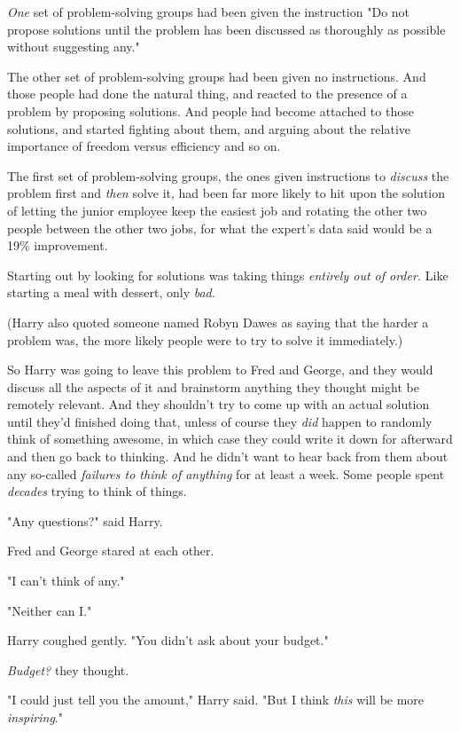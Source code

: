 \emph{One} set of problem-solving groups had been given the instruction "Do not
propose solutions until the problem has been discussed as thoroughly as
possible without suggesting any."

The other set of problem-solving groups had been given no instructions. And
those people had done the natural thing, and reacted to the presence of a
problem by proposing solutions. And people had become attached to those
solutions, and started fighting about them, and arguing about the relative
importance of freedom versus efficiency and so on.

The first set of problem-solving groups, the ones given instructions to
\emph{discuss} the problem first and \emph{then} solve it, had been far more
likely to hit upon the solution of letting the junior employee keep the easiest
job and rotating the other two people between the other two jobs, for what the
expert's data said would be a 19\% improvement.

Starting out by looking for solutions was taking things \emph{entirely out of
order.} Like starting a meal with dessert, only \emph{bad.}

(Harry also quoted someone named Robyn Dawes as saying that the harder a
problem was, the more likely people were to try to solve it immediately.)

So Harry was going to leave this problem to Fred and George, and they would
discuss all the aspects of it and brainstorm anything they thought might be
remotely relevant. And they shouldn't try to come up with an actual solution
until they'd finished doing that, unless of course they \emph{did} happen to
randomly think of something awesome, in which case they could write it down for
afterward and then go back to thinking. And he didn't want to hear back from
them about any so-called \emph{failures to think of anything} for at least a
week. Some people spent \emph{decades} trying to think of things.

"Any questions?" said Harry.

Fred and George stared at each other.

"I can't think of any."

"Neither can I."

Harry coughed gently. "You didn't ask about your budget."

\emph{Budget?} they thought.

"I could just tell you the amount," Harry said. "But I think \emph{this} will
be more \emph{inspiring}."

